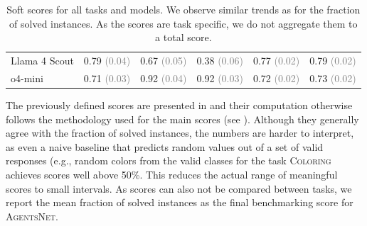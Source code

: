 \documentclass{article}
\newcommand{\benchmark}{\textsc{AgentsNet}}
\begin{document}
\begin{table}[]
{\begin{tabular}{lccccc}
Llama 4 Scout & 0.79 \tiny \textcolor{gray}{(0.04)} & 0.67 \tiny \textcolor{gray}{(0.05)} & 0.38 \tiny \textcolor{gray}{(0.06)} & 0.77 \tiny \textcolor{gray}{(0.02)} & 0.79 \tiny \textcolor{gray}{(0.02)}\\
o4-mini & 0.71 \tiny \textcolor{gray}{(0.03)} & 0.92 \tiny \textcolor{gray}{(0.04)} & 0.92 \tiny \textcolor{gray}{(0.03)} & 0.72 \tiny \textcolor{gray}{(0.02)} & 0.73 \tiny \textcolor{gray}{(0.02)}\\
       \bottomrule
    \end{tabular}}
    \caption{Soft scores for all tasks and models. We observe similar trends as for the fraction of solved instances. As the scores are task specific, we do not aggregate them to a total score.}
    \label{tab:app_score_results}
\end{table}
The previously defined scores are presented in  and their computation otherwise follows the methodology used for the main scores (see ). Although they generally agree with the fraction of solved instances, the numbers are harder to interpret, as even a naive baseline that predicts random values out of a set of valid responses (e.g., random colors from the valid classes for the task \textsc{Coloring} achieves scores well above 50\%. This reduces the actual range of meaningful scores to small intervals. As scores can also not be compared between tasks, we report the mean fraction of solved instances as the final benchmarking score for \benchmark{}.
\end{document}
